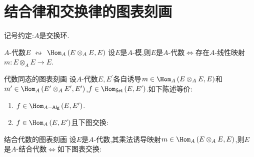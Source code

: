 \section{结合律和交换律的图表刻画}

记号约定:$A$是交换环.

\begin{proposition}{$A$-代数$E$ $\leftrightsquigarrow$ $\Hom_{A}\left(E\otimes_{A}E,E\right)$}{}
	设$E$是$A$-模,则$E$是$A$-代数$\iff$存在$A$-线性映射$m:E\otimes_{A}E\to E$.
\end{proposition}

\begin{proposition}{代数同态的图表刻画}{}
	设$A$-代数$E,E^{\prime}$各自诱导$m\in\Hom_{A}\left(E\otimes_{A}E,E\right)$和$m^{\prime}\in\Hom_{A}\left(E^{\prime}\otimes_{A}E^{\prime},E^{\prime}\right)$,$f\in\Hom_{\mathsf{Set}}\left(E,E^{\prime}\right)$.如下陈述等价:
	\begin{enumerate}
		\item $f\in\Hom_{A-\mathsf{Alg}}\left(E,E^{\prime}\right)$.
		\item $f\in\Hom_{A}\left(E,E^{\prime}\right)$且下图交换:
		\begin{center}
		\end{center}
	\end{enumerate}
\end{proposition}

\begin{proposition}{结合代数的图表刻画}{}
	设$E$是$A$-代数,其乘法诱导映射$m\in\Hom_{A}\left(E\otimes_{A}E,E\right)$,则$E$是$A$-结合代数$\iff$如下图表交换:
	\begin{center}
	\end{center}
\end{proposition}

